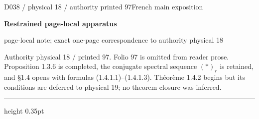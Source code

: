 \documentclass[9pt]{article}
\newcommand{\CanonText}[1]{\par{\fontsize{8.0}{9.35}\selectfont\RaggedRight #1\par}\vspace{2.2pt}}
\newcommand{\LayerTitle}{Restrained page-local apparatus}
\begin{document}
\noindent\begin{minipage}[t][\dimexpr\textheight-5pt\relax][t]{\textwidth}
{\sffamily\fontsize{7.3}{8.2}\selectfont\color{Quiet} D038 / physical 18 / authority printed 97\hfill French main exposition}
\par{}\vspace{4.5pt}
{\sffamily\fontsize{10.4}{11.6}\selectfont\bfseries\color{Accent} \LayerTitle}
\par{\sffamily\fontsize{6.7}{7.7}\selectfont\color{Quiet} page-local note; exact one-page correspondence to authority physical 18}
\vspace{5pt}
\CanonText{Authority physical 18 / printed 97. Folio 97 is omitted from reader prose. Proposition 1.3.6 is completed, the conjugate spectral sequence \((*)_{r}\) is retained, and §1.4 opens with formulas (1.4.1.1)–(1.4.1.3). Théorème 1.4.2 begins but its conditions are deferred to physical 19; no theorem closure was inferred.}
\vfill
{\color{Accent}\hrule height 0.35pt}\vspace{3pt}
\end{minipage}
\newpage
\end{document}

